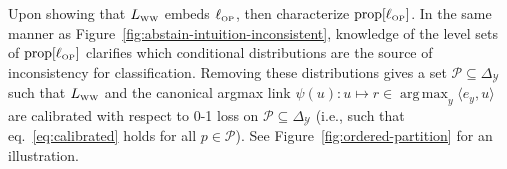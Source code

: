 \documentclass[twoside,11pt]{article}
\newcommand{\Comments}{1}
\newcommand{\mynote}[2]{\ifnum\Comments=1\textcolor{#1}{#2}\fi}
\newcommand{\jessie}[1]{\mynote{teal}{[JF: #1]}}
\newcommand{\prop}[1]{\mathrm{prop}[#1]}
\newcommand{\LWW}{L_{\text{\tiny WW}}}
\newcommand{\ellOP}{\ell_{\text{\tiny OP}}}
\newcommand{\mode}{\mathrm{mode}}
\newcommand{\simplex}{\Delta_\Y}
\renewcommand{\P}{\mathcal{P}}
\newcommand{\T}{\mathcal{T}}
\newcommand{\Y}{\mathcal{Y}}
\newcommand{\inprod}[2]{\langle #1, #2 \rangle}%
\DeclareMathOperator*{\argmax}{arg\,max}
\begin{document}
Upon showing that $\LWW$ embeds $\ellOP$, \citeauthor{wang2020weston} then characterize $\prop{\ellOP}$.
In the same manner as Figure~\ref{fig:abstain-intuition-inconsistent}, knowledge of the level sets of $\prop{\ellOP}$ clarifies which conditional distributions are the source of inconsistency for classification.
Removing these distributions gives a set $\P \subseteq \simplex$
such that $\LWW$ and the canonical argmax link $\psi(u) : u \mapsto r \in \argmax_y \inprod{e_y}{u}$ are calibrated with respect to 0-1 loss on $\P \subseteq \simplex$ (i.e., such that eq.~\eqref{eq:calibrated} holds for all $p \in \P$).
See Figure~\ref{fig:ordered-partition} for an illustration.
\end{document}
